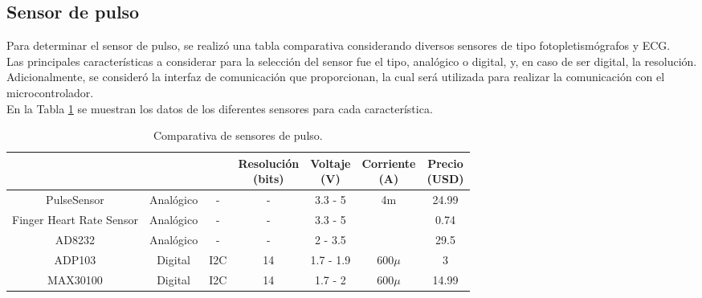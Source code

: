 
\subsection{Sensor de pulso}
Para determinar el sensor de pulso, se realizó una tabla comparativa considerando diversos sensores de tipo fotopletismógrafos y ECG. \\

Las principales características a considerar para la selección del sensor fue el tipo, analógico o digital, y, en caso de ser digital, la resolución. Adicionalmente, se consideró la interfaz de comunicación que proporcionan, la cual será utilizada para realizar la comunicación con el microcontrolador.\\

En la Tabla \ref{analisis:sensorPulso} se muestran los datos de los diferentes sensores para cada característica.



\begin{table}[htbp]
	\begin{center}
		\begin{tabular}{|c|c|c|c|c|c|c|}
			\hline
			\thead{Modelo}&\thead{Tipo}&\thead{Interfaz}&\thead{Resolución \\ (bits)}&\thead{Voltaje \\ (V)}& \thead{Corriente \\ (A)}&\thead{Precio\\ (USD)}\\
			\hline
			\hline
			PulseSensor & Analógico&-&-& 3.3 - 5&4m&24.99 \\
			\hline
			Finger Heart Rate Sensor & Analógico& -&- & 3.3 - 5&&0.74 \\
			\hline
			AD8232 & Analógico& -& - & 2 - 3.5&&29.5 \\
			\hline
			ADP103 & Digital& I2C& 14 & 1.7 - 1.9&$600\mu$&3 \\
			\hline
			MAX30100 & Digital& I2C &14 & 1.7 - 2&$600\mu$&14.99 \\
			\hline
		\end{tabular}
		\caption{Comparativa de sensores de pulso.}
		\label{analisis:sensorPulso}
	\end{center}
\end{table}

